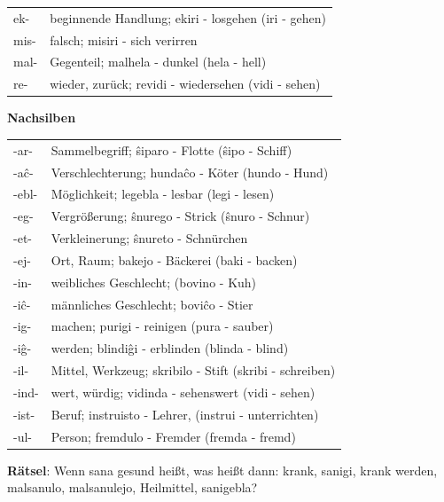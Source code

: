 \begin{tabular}{ll}
ek-  &beginnende Handlung; ekiri - losgehen {\footnotesize (iri - gehen)}\\
mis- &falsch; misiri - sich verirren\\
mal- &Gegenteil; malhela - dunkel {\footnotesize (hela - hell)}\\
re-  &wieder, zurück; revidi - wiedersehen {\footnotesize (vidi - sehen)}\\
\end{tabular}

\textbf{Nachsilben}

\begin{tabular}{ll}
-ar-  &Sammelbegriff; ŝiparo - Flotte {\footnotesize(ŝipo - Schiff)}\\
-aĉ-  &Verschlechterung; hundaĉo - Köter {\footnotesize(hundo - Hund)}\\
-ebl- &Möglichkeit; legebla - lesbar {\footnotesize(legi - lesen)}\\
-eg-  &Vergrößerung; ŝnurego - Strick {\footnotesize (ŝnuro - Schnur)}\\
-et-  &Verkleinerung; ŝnureto - Schnürchen \\
-ej-  &Ort, Raum; bakejo - Bäckerei {\footnotesize(baki - backen)}\\
-in-  &weibliches Geschlecht; {\footnotesize (bovino - Kuh)}\\
-iĉ-  &männliches Geschlecht; boviĉo - Stier\\
-ig-  &machen; purigi - reinigen {\footnotesize(pura - sauber)}\\
-iĝ-  &werden; blindiĝi - erblinden {\footnotesize(blinda - blind)}\\
-il-  &Mittel, Werkzeug; skribilo - Stift {\footnotesize(skribi - schreiben)}\\
-ind- &wert, würdig; vidinda - sehenswert {\footnotesize (vidi - sehen)}\\
-ist- &Beruf; instruisto - Lehrer, {\footnotesize (instrui - unterrichten)}\\
-ul-  &Person; fremdulo - Fremder {\footnotesize (fremda - fremd)}
\end{tabular}

\textbf{Rätsel}: Wenn sana gesund heißt, was heißt dann: krank, sanigi, krank werden, malsanulo, malsanulejo, Heilmittel, sanigebla?

\vspace{-.5cm}

\clearpage

\vspace{-.6cm}

